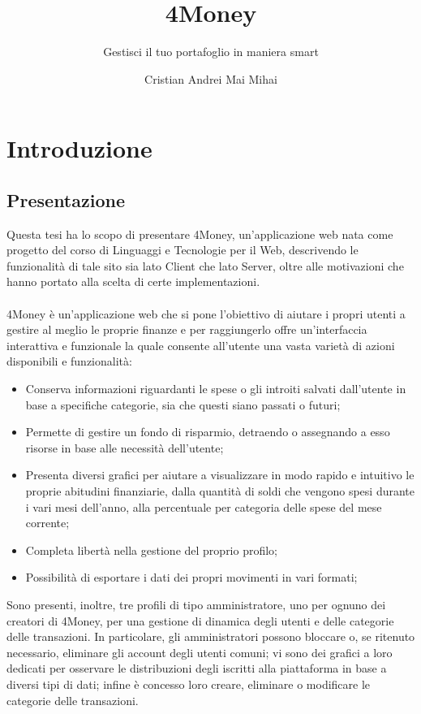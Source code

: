 \documentclass[binding=0.6cm, oneside, noexaminfo, italian]{sapthesis}
\title{4Money}
\subtitle{Gestisci il tuo portafoglio in maniera smart}
\author{Cristian Andrei Mai Mihai}
\newcommand\blankpage{%
    \null
    \thispagestyle{empty}%
    \addtocounter{page}{-1}%
    \newpage}
\begin{document}
\frontmatter
\maketitle

\afterpage{\blankpage}

\newpage

\tableofcontents

\mainmatter
\newpage

\section{Introduzione}
\subsection{Presentazione}
Questa tesi ha lo scopo di presentare 4Money, un’applicazione web nata come progetto del corso di Linguaggi e Tecnologie per il Web, descrivendo le funzionalità di tale sito sia lato Client che lato Server, oltre alle motivazioni che hanno portato alla scelta di certe implementazioni. \\ \\
4Money è un’applicazione web che si pone l’obiettivo di aiutare i propri utenti a gestire al meglio le proprie finanze e per raggiungerlo offre un’interfaccia interattiva e funzionale la quale consente all’utente una vasta varietà di azioni disponibili e funzionalità:
\begin{itemize}
    \item Conserva informazioni riguardanti le spese o gli introiti salvati dall’utente in base a specifiche categorie, sia che questi siano passati o futuri;
    \item Permette di gestire un fondo di risparmio, detraendo o assegnando a esso risorse in base alle necessità dell’utente;
    \item Presenta diversi grafici per aiutare a visualizzare in modo rapido e intuitivo le proprie abitudini finanziarie, dalla quantità di soldi che vengono spesi durante i vari mesi dell’anno, alla percentuale per categoria delle spese del mese corrente;
    \item Completa libertà nella gestione del proprio profilo;
    \item Possibilità di esportare i dati dei propri movimenti in vari formati;
\end{itemize}
Sono presenti, inoltre, tre profili di tipo amministratore, uno per ognuno dei creatori di 4Money, per una gestione di dinamica degli utenti e delle categorie delle transazioni. In particolare, gli amministratori possono bloccare o, se ritenuto necessario, eliminare gli account degli utenti comuni; vi sono dei grafici a loro dedicati per osservare le distribuzioni degli iscritti alla piattaforma in base a diversi tipi di dati; infine è concesso loro creare, eliminare o modificare le categorie delle transazioni.
\end{document}
